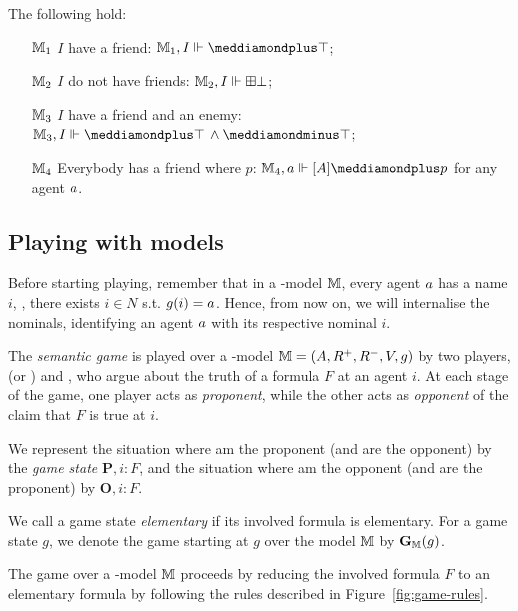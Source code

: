 \begin{example}
\begin{center}
\begin{tikzpicture}[x=0.75pt,y=0.75pt,yscale=-1,xscale=1]
\end{tikzpicture}

\end{center}
The following hold:
\begin{itemize}
\item[$\M_1$] $I$ have a friend: $\M_1, I \Vdash \dplus\top$;
\item[$\M_2$] $I$ do not have friends: $\M_2, I \Vdash \bplus\bot$;
\item[$\M_3$] $I$ have a friend and an enemy: $\M_3, I \Vdash \dplus \top\,\wedge \dminus\top$;
\item[$\M_4$] Everybody has a friend where $p$: $\M_4, \ag \Vdash  [A ]  \dplus p$ for any agent $\ag$.
\end{itemize} 
 \end{example}


\subsection{Playing with models}\label{sec:game-semantics}
Before starting playing, remember that in a \PNL-model $\M$, every agent $\ag$ has a name $i$, \ie, there exists $i\in N$ s.t. $\g(i)=\ag$. Hence, from now on, we will internalise the nominals, identifying an agent $\ag$ with its respective nominal $i$.

The  \emph{semantic game} is played over a \PNL-model $\M=(\A,\R^+,\R^-,\V,\g)$ by two
players, \Me (or \Ic) and \You, who argue about the truth of a formula $ F $ at an
agent $i$. At each stage of the game, one player acts as \emph{proponent}, while the
other acts as \emph{opponent} of the claim that  $ F $ is true at 
$i$. 

We represent the situation where \Ic am the proponent (and \You are the
opponent) by the \emph{game state} $\mathbf{P}, i: F $, and the situation
where \Ic am the opponent (and \You are the proponent) by $\mathbf{O},
i: F $. 

We call a game state \emph{elementary} if its involved formula is elementary. For a game state $g$, we denote the game starting at $g$ over the model $\M$ by $\mathbf{G}_\M(g)$.

The game over a \PNL-model $\M$ proceeds by reducing the involved formula $ F $ to an elementary formula by following the rules described in Figure~\ref{fig:game-rules}.


